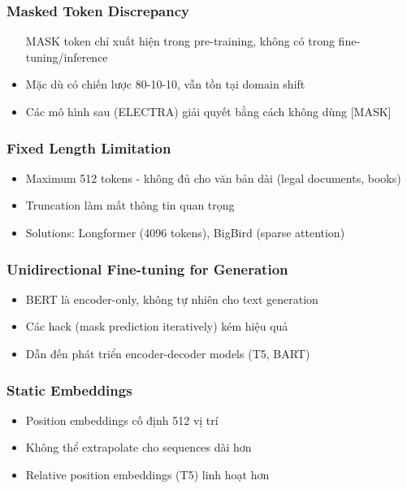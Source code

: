 \subsubsection{Masked Token Discrepancy}
\begin{itemize}
    \item [MASK] token chỉ xuất hiện trong pre-training, không có trong fine-tuning/inference
    \item Mặc dù có chiến lược 80-10-10, vẫn tồn tại domain shift
    \item Các mô hình sau (ELECTRA) giải quyết bằng cách không dùng [MASK]
\end{itemize}

\subsubsection{Fixed Length Limitation}
\begin{itemize}
    \item Maximum 512 tokens - không đủ cho văn bản dài (legal documents, books)
    \item Truncation làm mất thông tin quan trọng
    \item Solutions: Longformer (4096 tokens), BigBird (sparse attention)
\end{itemize}

\subsubsection{Unidirectional Fine-tuning for Generation}
\begin{itemize}
    \item BERT là encoder-only, không tự nhiên cho text generation
    \item Các hack (mask prediction iteratively) kém hiệu quả
    \item Dẫn đến phát triển encoder-decoder models (T5, BART)
\end{itemize}

\subsubsection{Static Embeddings}
\begin{itemize}
    \item Position embeddings cố định 512 vị trí
    \item Không thể extrapolate cho sequences dài hơn
    \item Relative position embeddings (T5) linh hoạt hơn
\end{itemize}

